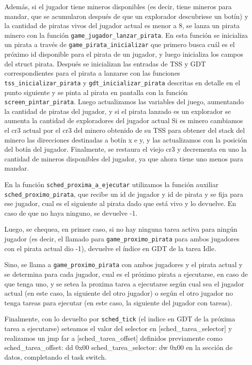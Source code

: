 Además, si el jugador tiene mineros disponibles (es decir, tiene mineros para mandar, que se acumularon después de que un explorador descubriese un botín) y la cantidad de piratas vivos del jugador actual es menor a 8, se lanza un pirata minero con la función \texttt{game\_jugador\_lanzar\_pirata}. En esta función se inicializa un pirata a través de \texttt{game\_pirata\_inicializar} que primero busca cuál es el próximo id disponible para el pirata de un jugador, y luego inicializa los campos del struct pirata.
Después se inicializan las entradas de TSS y GDT correspondientes para el pirata a lanzarse con las funciones \texttt{tss\_inicializar\_pirata} y \texttt{gdt\_inicializar\_pirata} descritas en detalle en el punto siguiente y se pinta al pirata en pantalla con la función \texttt{screen\_pintar\_pirata}.
Luego actualizamos las variables del juego, aumentando la cantidad de piratas del jugador, y si el pirata lanzado es un explorador se aumenta la cantidad de exploradores del jugador actual
Si es minero cambiamos el cr3 actual por el cr3 del minero obtenido de su TSS para obtener del stack del minero las direcciones destinadas a botín x e y, y las actualizamos con la posición del botín del jugador.
Finalmente, se restaura el viejo cr3 y decrementa en uno la cantidad de mineros disponibles del jugador, ya que ahora tiene uno menos para mandar.


En la función \texttt{sched\_proxima\_a\_ejecutar} utilizamos la función auxiliar \texttt{sched\_proximo\_pirata}, que recibe un id de jugador y id de pirata y se fija para ese jugador, cual es el siguiente al pirata dado que está vivo y lo devuelve. En caso de que no haya ninguno, se devuelve -1.

Luego, se chequea, en primer caso, si no hay ninguna tarea activa para ningún jugador (es decir, el llamado para \texttt{game\_proximo\_pirata} para ambos jugadores con el pirata actual dio -1), devuelve el índice en GDT de la tarea Idle.

Sino, se llama a \texttt{game\_proximo\_pirata} con ambos jugadores y el pirata actual y se determina para cada jugador, cual es el próximo pirata a ejecutarse, en caso de que tenga uno, y se setea la proxima tarea a ejecutarse según cual sea el jugador actual (en este caso, la siguiente del otro jugador) o según el otro jugador no tenga tareas para ejecutar (en este caso, la siguiente del jugador con tareas). 

Finalmente, con lo devuelto por \texttt{sched\_tick} (el indice en GDT de la próxima tarea a ejecutarse) seteamos el valor del selector en [sched\_tarea\_selector] y realizamos un jmp far a [sched\_tarea\_offset] definidos previamente como sched\_tarea\_offset: dd 0x00 sched\_tarea\_selector: dw 0x00 en la sección de datos, completando el task switch.


